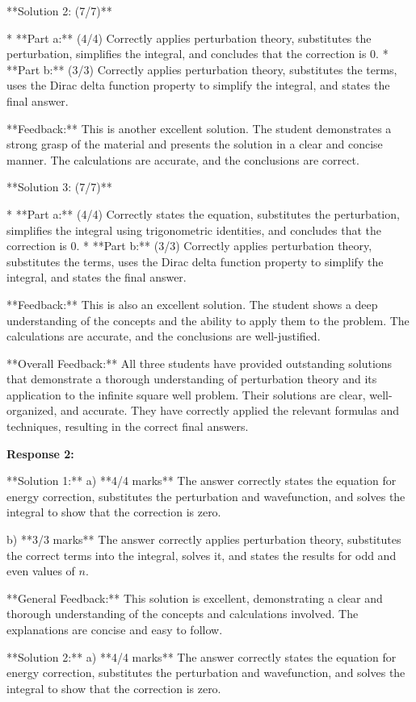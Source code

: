 \documentclass[a4paper,11pt]{article}
\begin{document}
**Solution 2: (7/7)**

*   **Part a:** (4/4) Correctly applies perturbation theory, substitutes the perturbation, simplifies the integral, and concludes that the correction is 0.
*   **Part b:** (3/3) Correctly applies perturbation theory, substitutes the terms, uses the Dirac delta function property to simplify the integral, and states the final answer.

**Feedback:** This is another excellent solution. The student demonstrates a strong grasp of the material and presents the solution in a clear and concise manner. The calculations are accurate, and the conclusions are correct.

**Solution 3: (7/7)**

*   **Part a:** (4/4) Correctly states the equation, substitutes the perturbation, simplifies the integral using trigonometric identities, and concludes that the correction is 0.
*   **Part b:** (3/3) Correctly applies perturbation theory, substitutes the terms, uses the Dirac delta function property to simplify the integral, and states the final answer.

**Feedback:** This is also an excellent solution. The student shows a deep understanding of the concepts and the ability to apply them to the problem. The calculations are accurate, and the conclusions are well-justified.

**Overall Feedback:** All three students have provided outstanding solutions that demonstrate a thorough understanding of perturbation theory and its application to the infinite square well problem. Their solutions are clear, well-organized, and accurate. They have correctly applied the relevant formulas and techniques, resulting in the correct final answers.


\textbf{Response 2:}

**Solution 1:**
a) **4/4 marks**
The answer correctly states the equation for energy correction, substitutes the perturbation and wavefunction, and solves the integral to show that the correction is zero.

b) **3/3 marks**
The answer correctly applies perturbation theory, substitutes the correct terms into the integral, solves it, and states the results for odd and even values of \(n\).

**General Feedback:** This solution is excellent, demonstrating a clear and thorough understanding of the concepts and calculations involved. The explanations are concise and easy to follow.

**Solution 2:**
a) **4/4 marks**
The answer correctly states the equation for energy correction, substitutes the perturbation and wavefunction, and solves the integral to show that the correction is zero.
\end{document}
